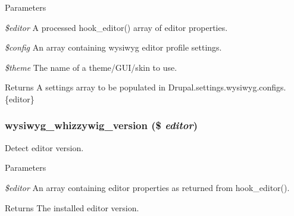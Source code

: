 \begin{DoxyParams}{Parameters}
\item[{\em \$editor}]A processed hook\_\-editor() array of editor properties. \item[{\em \$config}]An array containing wysiwyg editor profile settings. \item[{\em \$theme}]The name of a theme/GUI/skin to use.\end{DoxyParams}
\begin{DoxyReturn}{Returns}
A settings array to be populated in Drupal.settings.wysiwyg.configs.\{editor\} 
\end{DoxyReturn}
\hypertarget{whizzywig_8inc_a97c05de4cd3a5018b3556518f3439b94}{
\subsubsection[{wysiwyg\_\-whizzywig\_\-version}]{\setlength{\rightskip}{0pt plus 5cm}wysiwyg\_\-whizzywig\_\-version (\$ {\em editor})}}
\label{whizzywig_8inc_a97c05de4cd3a5018b3556518f3439b94}
Detect editor version.


\begin{DoxyParams}{Parameters}
\item[{\em \$editor}]An array containing editor properties as returned from hook\_\-editor().\end{DoxyParams}
\begin{DoxyReturn}{Returns}
The installed editor version. 
\end{DoxyReturn}
